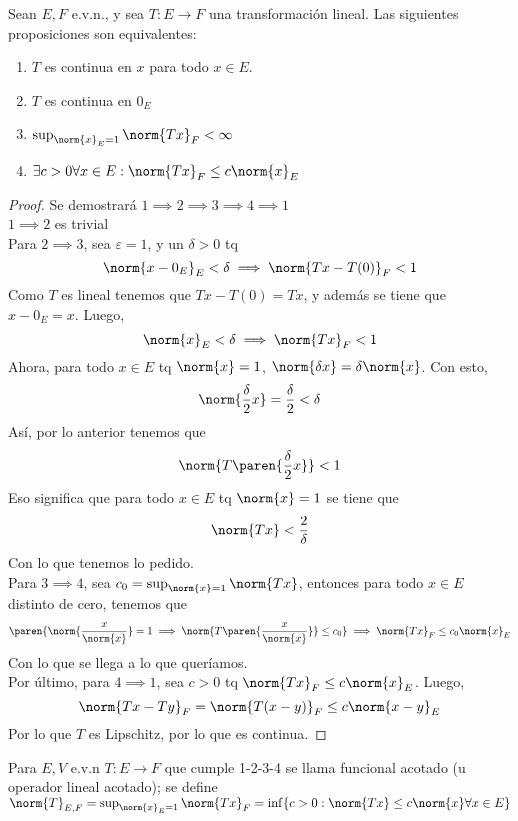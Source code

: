 \documentclass{notetaking}
\begin{document}
\begin{thm}
    Sean \(E,F\) e.v.n., y sea \(T:E\rightarrow F\) una transformación lineal. Las siguientes proposiciones son equivalentes:
    \begin{enumerate}
        \item \(T\) es continua en \(x\) para todo \(x\in E\).
        \item \(T\) es continua en \(0_E\)
        \item \(\sup_{\norm{x}_E=1}\norm{Tx}_F<\infty\)
        \item \(\exists c>0\forall x\in E:\norm{Tx}_F\leq c\norm{x}_E\) 
    \end{enumerate}
\end{thm}

\begin{proof}
    Se demostrará \(1\implies 2\implies 3\implies 4\implies 1\)\\
    \(1\implies 2\) es trivial\\
    Para \(2\implies 3\), sea \(\varepsilon=1\), y un \(\delta>0\) tq 
    \[
        \norm{x-0_E}_E<\delta\implies\norm{Tx-T(0)}_F<1
    \]
    Como \(T\) es lineal tenemos que \(Tx-T(0)=Tx\), y además se tiene que \(x-0_E=x\). Luego,
    \[
        \norm{x}_E<\delta\implies\norm{Tx}_F<1
    \]
    Ahora, para todo \(x\in E\) tq \(\norm{x}=1\), \(\norm{\delta x}=\delta\norm{x}\). Con esto,
    \[
        \norm{\frac\delta2x}=\frac\delta2<\delta
    \]
    Así, por lo anterior tenemos que
    \[
        \norm{T\paren{\frac\delta2x}}<1
    \]
    Eso significa que para todo \(x\in E\) tq \(\norm{x}=1\) se tiene que
    \[
        \norm{Tx}<\frac2\delta
    \]
    Con lo que tenemos lo pedido.\\
    Para \(3\implies 4\), sea \(c_0=\sup_{\norm{x}=1}\norm{Tx}\), entonces para todo \(x\in E\) distinto de cero, tenemos que
    \[
        \paren{\norm{\frac{x}{\norm{x}}}=1\implies\norm{T\paren{\frac{x}{\norm{x}}}}\leq c_0}\implies \norm{Tx}_F\leq c_0\norm{x}_E
    \]
    Con lo que se llega a lo que queríamos.\\
    Por último, para \(4\implies 1\), sea \(c>0\) tq \(\norm{Tx}_F\leq c\norm{x}_E\). Luego,
    \[
        \norm{Tx-Ty}_F=\norm{T(x-y)}_F\leq c\norm{x-y}_E
    \]
    Por lo que \(T\) es Lipschitz, por lo que es continua.
\end{proof}

\begin{defn}
    Para \(E,V\) e.v.n \(T:E\rightarrow F\) que cumple 1-2-3-4 se llama funcional acotado (u operador lineal acotado); se define \(\norm{T}_{E,F}=\sup_{\norm{x}_E=1}\norm{Tx}_F=\inf\{c>0:\norm{Tx}\leq c\norm{x}\forall x\in E\}\)
\end{defn}
\end{document}
